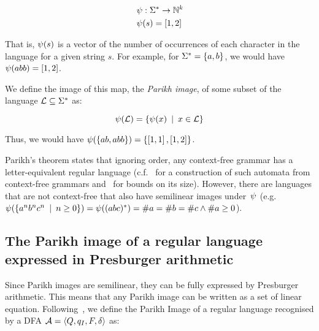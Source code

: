 \documentclass[acmsmall,review,anonymous]{acmart}\settopmatter{printfolios=true,printccs=false,printacmref=true}
\theoremstyle{definition}
\begin{document}
$$
\begin{aligned}
& \ParikhMap: \MapFromTo{\Strings}{\natural^k} \\
& \ParikhMap(s) = \VectorLiteral{\#a_1(s), \#a_2(s), \ldots, \#a_k(s)}
\end{aligned}
$$

That is, $\ParikhMap(s)$ is a vector of the number of occurrences of each
character in the language for a given string $s$. For example, for  $\Strings =
\Set{a, b}$, we would have $\ParikhMap(abb) = \VectorLiteral{1, 2}$.

We define the image of this map, the \textit{Parikh image}, of some subset of
the language $\Language \subseteq \Strings$ as:

\[
\ParikhMap(\Language) = \Set{\ParikhMap(x) \SuchThat x \in \Language}
\]

Thus, we would have $\ParikhMap(\left\{ab, abb\right\}) = \left\{\left[1,
1\right], \left[1, 2\right]\right\}$.

Parikh's theorem states that ignoring order, any context-free grammar has a
letter-equivalent regular language (c.f.~\cite{construction} for a construction of
such automata from context-free grammars and~\cite{bounds} for bounds on its size). However, there are languages that are
not context-free that also have semilinear images under~$\ParikhMap$ (e.g.
$\ParikhMap(\Set{a^nb^nc^n \SuchThat n \geq 0}) = \ParikhMap((abc)^*) = \#a =
\#b = \#c \land \#a \geq 0$).

\subsection{The Parikh image of a regular language expressed in Presburger arithmetic}

Since Parikh images are semilinear, they can be fully expressed by Presburger
arithmetic. This means that any Parikh image can be written as a set of linear
equation. Following~\cite{generate-parikh-image}, we define the Parikh Image of
a regular language recognised by a DFA $\Automaton = \AutomatonTuple$ as:
\end{document}

